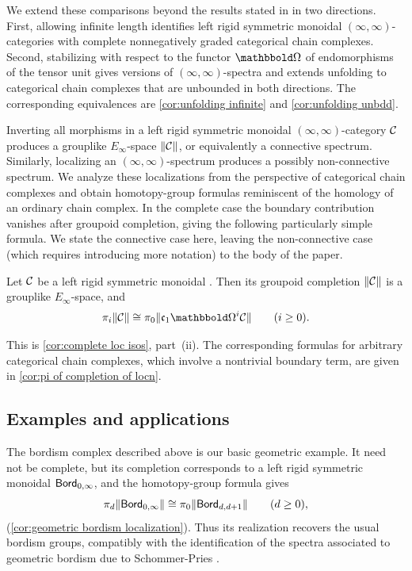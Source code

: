 \documentclass[a4paper,11pt]{article}
\begin{document}
We extend these comparisons beyond the results stated in
\cite{LurieCob} in two directions. First, allowing infinite length
identifies left
rigid symmetric monoidal $(\infty,\infty)$-categories with complete
nonnegatively graded categorical chain complexes. Second, stabilizing
with respect to the functor $\mOm$ of endomorphisms of the tensor unit
gives versions of $(\infty,\infty)$-spectra and extends
unfolding to categorical chain complexes that are unbounded in both
directions. The corresponding equivalences are
\cref{cor:unfolding infinite} and \cref{cor:unfolding unbdd}.

Inverting all morphisms in a left rigid symmetric monoidal
$(\infty,\infty)$-category $\mathcal{C}$ produces a grouplike
$E_{\infty}$-space $\|\mathcal{C}\|$, or equivalently a connective
spectrum.  Similarly, localizing an $(\infty,\infty)$-spectrum
produces a possibly non-connective spectrum.  We analyze these
localizations from the perspective of categorical chain complexes and
obtain homotopy-group formulas reminiscent of the homology of an
ordinary chain complex. In the complete case the boundary contribution
vanishes after groupoid completion, giving the following particularly
simple formula. We state the connective case here, leaving the
non-connective case (which requires introducing more notation) to the
body of the paper.


\begin{theoremint}\label{introthm:homotopy-groups}
Let $\mathcal{C}$ be a left rigid symmetric monoidal \iicat{}. Then its groupoid
completion $\|\mathcal{C}\|$ is a grouplike $E_{\infty}$-space, and
\[
  \pi_{i}\Lgpd{\nC}
    \cong\pi_{0}\Lgpd{\core\mOm^{i}\nC}
  \qquad(i\geq0).
\]
\end{theoremint}

This is \cref{cor:complete loc isos}, part~(ii).
The corresponding formulas for arbitrary categorical chain complexes,
which involve a nontrivial boundary term, are given in
\cref{cor:pi of completion of locn}.


\subsection*{Examples and applications}

The bordism complex described above is our basic geometric example.
It need not be complete, but its completion corresponds to a left rigid symmetric
monoidal \iicat{} $\textup{\textsf{Bord}}_{0,\infty}$, and the
homotopy-group formula gives
\[
  \pi_{d}\|\textup{\textsf{Bord}}_{0,\infty}\|
    \cong\pi_{0}\|\textup{\textsf{Bord}}_{d,d+1}\|
  \qquad(d\geq0), 
\]
(\cref{cor:geometric bordism localization}).
Thus its realization recovers the usual bordism groups, compatibly
with the identification of the spectra associated to
geometric bordism \iicats{} due to Schommer-Pries \cite{SPinv}.
\end{document}
